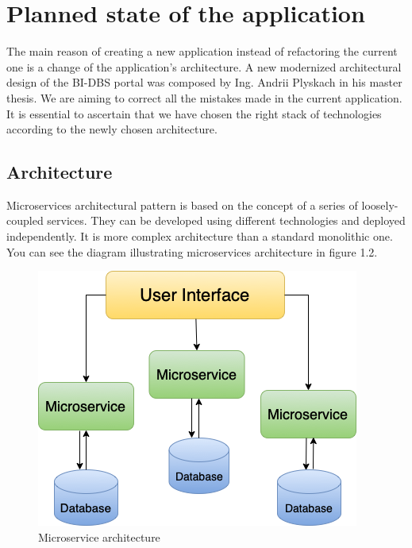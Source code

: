 \section{Planned state of the application} The main reason of creating a new application instead of refactoring the current one is a change of the application's architecture. A new modernized architectural design of the BI-DBS portal was composed by Ing. Andrii Plyskach in his master thesis\cite{mt-plyskach}. We are aiming to correct all the mistakes made in the current application. It is essential to ascertain that we have chosen the right stack of technologies according to the newly chosen architecture.

\subsection{Architecture}
Microservices architectural pattern\cite{architecture-haris} is based on the concept of a series of loosely-coupled services. They can be developed using different technologies and deployed independently. It is more complex architecture than a standard monolithic one. You can see the diagram illustrating microservices architecture in figure 1.2. 

\begin{figure}[hp]
\centering
\includegraphics[scale=0.67]{../png/microservices.png}
\caption{Microservice architecture}\label{picture:microservices}
\end{figure}


